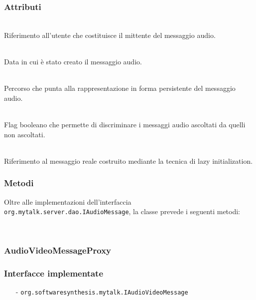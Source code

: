 \subsubsection*{Attributi}
\begin{description}
  \item{}\\
Riferimento all'utente che costituisce il mittente del messaggio audio.
  \item{}\\
Data in cui è stato creato il messaggio audio.
  \item{}\\
Percorso che punta alla rappresentazione in forma persistente del messaggio audio.
  \item{}\\
Flag booleano che permette di discriminare i messaggi audio ascoltati da quelli non ascoltati.
  \item{}\\
Riferimento al messaggio reale costruito mediante la tecnica di lazy initialization.
\end{description}

\subsubsection*{Metodi}
Oltre alle implementazioni dell'interfaccia \texttt{org.mytalk.server.dao.IAudioMessage}, la classe prevede i seguenti metodi:
\begin{description}
\item{}\\
\end{description}

\subsubsection{AudioVideoMessageProxy}\label{sec:audiovideomessageproxy}

\subsubsection*{Interfacce implementate}
\begin{itemize}[noitemsep,nolistsep]
  \item[-]\texttt{org.softwaresynthesis.mytalk.IAudioVideoMessage}
\end{itemize}

